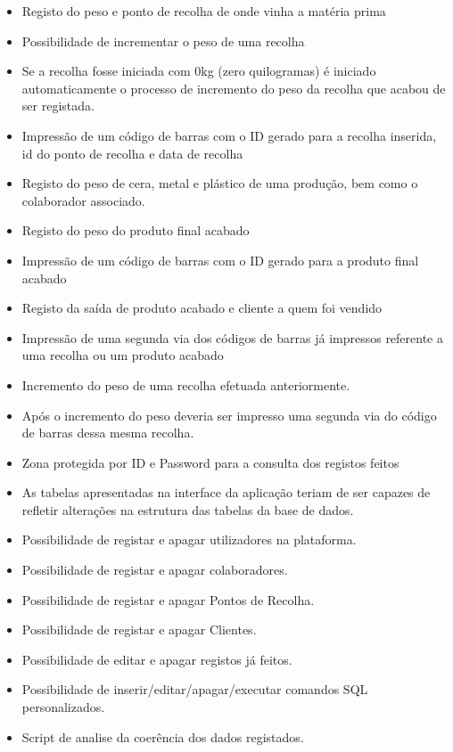 \begin{itemize}
	\item Registo do peso e ponto de recolha de onde vinha a matéria prima
	\item Possibilidade de incrementar o peso de uma recolha
	\item Se a recolha fosse iniciada com 0kg (zero quilogramas) é iniciado automaticamente o processo de incremento do peso da recolha que acabou de ser registada.
	\item Impressão de um código de barras com o ID gerado para a recolha inserida, id do ponto de recolha e data de recolha
	\item Registo do peso de cera, metal e plástico de uma produção, bem como o colaborador associado.
	\item Registo do peso do produto final acabado
	\item Impressão de um código de barras com o ID gerado para a produto final acabado
	\item Registo da saída de produto acabado e cliente a quem foi vendido
	\item Impressão de uma segunda via dos códigos de barras já impressos referente a uma recolha ou um produto acabado
	\item Incremento do peso de uma recolha efetuada anteriormente.
	\item Após o incremento do peso deveria ser impresso uma segunda via do código de barras dessa mesma recolha.
	\item Zona protegida por ID e Password para a consulta dos registos feitos
	\item As tabelas apresentadas na interface da aplicação teriam de ser capazes de refletir alterações na estrutura das tabelas da base de dados.
	\item Possibilidade de registar e apagar utilizadores na plataforma.
	\item Possibilidade de registar e apagar colaboradores.
	\item Possibilidade de registar e apagar Pontos de Recolha.
	\item Possibilidade de registar e apagar Clientes.
	\item Possibilidade de editar e apagar registos já feitos.
	\item Possibilidade de inserir/editar/apagar/executar comandos SQL personalizados.
	\item Script de analise da coerência dos dados registados.
\end{itemize}